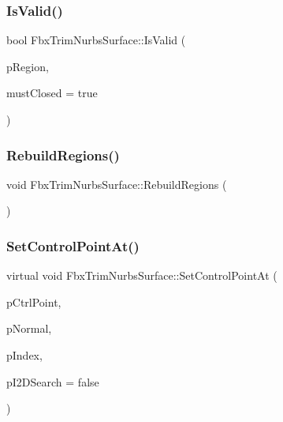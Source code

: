\subsubsection{\texorpdfstring{Is\+Valid()}{IsValid()}\hspace{0.1cm}{\footnotesize\ttfamily [2/2]}}
{\footnotesize\ttfamily bool Fbx\+Trim\+Nurbs\+Surface\+::\+Is\+Valid (\begin{DoxyParamCaption}\item[{int}]{p\+Region,  }\item[{bool}]{must\+Closed = {\ttfamily true} }\end{DoxyParamCaption})}

\mbox{\label{class_fbx_trim_nurbs_surface_ac233fb1ab17ead3b67615553b4b02165}} 
\subsubsection{\texorpdfstring{Rebuild\+Regions()}{RebuildRegions()}}
{\footnotesize\ttfamily void Fbx\+Trim\+Nurbs\+Surface\+::\+Rebuild\+Regions (\begin{DoxyParamCaption}{ }\end{DoxyParamCaption})}

\mbox{\label{class_fbx_trim_nurbs_surface_a8a42014521b0c91eba3554ecafe56814}} 
\subsubsection{\texorpdfstring{Set\+Control\+Point\+At()}{SetControlPointAt()}\hspace{0.1cm}{\footnotesize\ttfamily [1/2]}}
{\footnotesize\ttfamily virtual void Fbx\+Trim\+Nurbs\+Surface\+::\+Set\+Control\+Point\+At (\begin{DoxyParamCaption}\item[{const \hyperlink{class_fbx_vector4}{Fbx\+Vector4} \&}]{p\+Ctrl\+Point,  }\item[{const \hyperlink{class_fbx_vector4}{Fbx\+Vector4} \&}]{p\+Normal,  }\item[{int}]{p\+Index,  }\item[{bool}]{p\+I2\+D\+Search = {\ttfamily false} }\end{DoxyParamCaption})\hspace{0.3cm}{\ttfamily [virtual]}}

